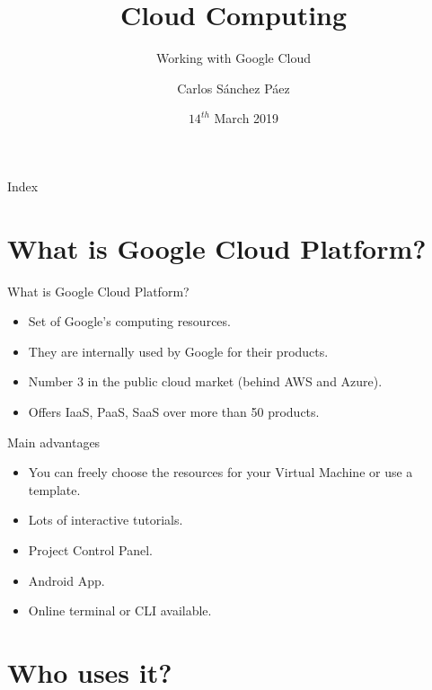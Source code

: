 \documentclass{beamer}
\title{Cloud Computing}
\date{$14^{th}$ March 2019}
\subtitle{Working with Google Cloud}
\author{Carlos Sánchez Páez}
\begin{document}
\centering
\begin{frame}
 \titlepage
\end{frame}

\begin{frame}{Index}
 \tableofcontents
\end{frame}

\section{What is Google Cloud Platform?}

\begin{frame}[fragile]{What is Google Cloud Platform?}
  \begin{itemize}[<+->]
    \item Set of Google's computing resources.
    \item They are internally used by Google for their products.
    \item Number 3 in the public cloud market (behind AWS and Azure).
    \item Offers IaaS, PaaS, SaaS over more than 50 products.
  \end{itemize}
\end{frame}


\begin{frame}[fragile]{Main advantages}
  \begin{itemize}[<+->]
    \item You can freely choose the resources for your Virtual Machine or use a template.
    \item Lots of interactive tutorials.
    \item Project Control Panel.
    \item Android App.
    \item Online terminal or CLI available.
  \end{itemize}
\end{frame}

\section{Who uses it?}
\end{document}
